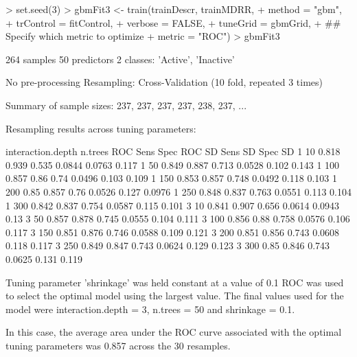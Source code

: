 \documentclass[12pt]{article}
\renewenvironment{Schunk}{\vspace{\topsep}}{\vspace{\topsep}}
\begin{document}
\begin{Schunk}
\begin{Sinput}
> set.seed(3)
> gbmFit3 <- train(trainDescr, trainMDRR, 
+                  method = "gbm", 
+                  trControl = fitControl, 
+                  verbose = FALSE, 
+                  tuneGrid = gbmGrid,
+                  ## Specify which metric to optimize
+                  metric = "ROC")
> gbmFit3
\end{Sinput}
\begin{Soutput}
264 samples
 50 predictors
  2 classes: 'Active', 'Inactive' 

No pre-processing
Resampling: Cross-Validation (10 fold, repeated 3 times) 

Summary of sample sizes: 237, 237, 237, 237, 238, 237, ... 

Resampling results across tuning parameters:

  interaction.depth  n.trees  ROC    Sens   Spec   ROC SD  Sens SD  Spec SD
  1                  10       0.818  0.939  0.535  0.0844  0.0763   0.117  
  1                  50       0.849  0.887  0.713  0.0528  0.102    0.143  
  1                  100      0.857  0.86   0.74   0.0496  0.103    0.109  
  1                  150      0.853  0.857  0.748  0.0492  0.118    0.103  
  1                  200      0.85   0.857  0.76   0.0526  0.127    0.0976 
  1                  250      0.848  0.837  0.763  0.0551  0.113    0.104  
  1                  300      0.842  0.837  0.754  0.0587  0.115    0.101  
  3                  10       0.841  0.907  0.656  0.0614  0.0943   0.13   
  3                  50       0.857  0.878  0.745  0.0555  0.104    0.111  
  3                  100      0.856  0.88   0.758  0.0576  0.106    0.117  
  3                  150      0.851  0.876  0.746  0.0588  0.109    0.121  
  3                  200      0.851  0.856  0.743  0.0608  0.118    0.117  
  3                  250      0.849  0.847  0.743  0.0624  0.129    0.123  
  3                  300      0.85   0.846  0.743  0.0625  0.131    0.119  

Tuning parameter 'shrinkage' was held constant at a value of 0.1
ROC was used to select the optimal model using  the largest value.
The final values used for the model were interaction.depth = 3, n.trees =
 50 and shrinkage = 0.1. 
\end{Soutput}
\end{Schunk}

In this case, the average area under the ROC curve associated with the
optimal tuning parameters was
0.857 across
the 30 resamples.
\end{document}
